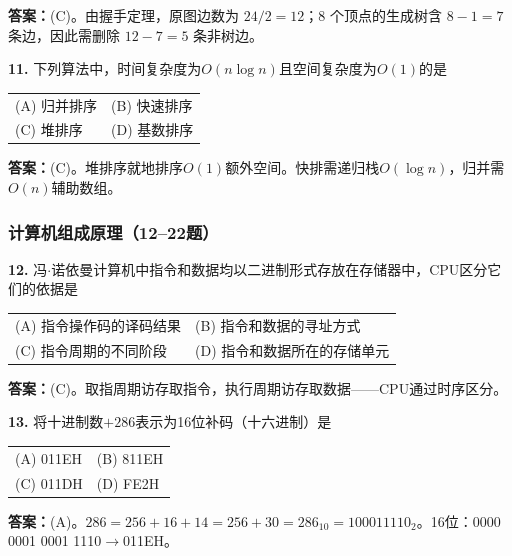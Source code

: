 \ifshowsolutions\par\noindent\textbf{答案：}(C)。由握手定理，原图边数为 $24/2=12$；8 个顶点的生成树含 $8-1=7$ 条边，因此需删除 $12-7=5$ 条非树边。\else \answerarea \fi

\vspace{6pt}

\noindent\textbf{11.} 下列算法中，时间复杂度为$O(n\log n)$且空间复杂度为$O(1)$的是
\begin{center}
\begin{tabular}{ll}
(A) 归并排序 & (B) 快速排序 \\[6pt]
(C) 堆排序 & (D) 基数排序
\end{tabular}
\end{center}

\ifshowsolutions\par\noindent\textbf{答案：}(C)。堆排序就地排序$O(1)$额外空间。快排需递归栈$O(\log n)$，归并需$O(n)$辅助数组。\else \answerarea \fi

\subsubsection*{计算机组成原理（12--22题）}

\noindent\textbf{12.} 冯$\cdot$诺依曼计算机中指令和数据均以二进制形式存放在存储器中，CPU区分它们的依据是
\begin{center}
\begin{tabular}{ll}
(A) 指令操作码的译码结果 & (B) 指令和数据的寻址方式 \\[6pt]
(C) 指令周期的不同阶段 & (D) 指令和数据所在的存储单元
\end{tabular}
\end{center}

\ifshowsolutions\par\noindent\textbf{答案：}(C)。取指周期访存取指令，执行周期访存取数据——CPU通过时序区分。\else \answerarea \fi

\vspace{6pt}

\noindent\textbf{13.} 将十进制数$+286$表示为16位补码（十六进制）是
\begin{center}
\begin{tabular}{ll}
(A) 011EH & (B) 811EH \\[6pt]
(C) 011DH & (D) FE2H
\end{tabular}
\end{center}

\ifshowsolutions\par\noindent\textbf{答案：}(A)。$286=256+16+14=256+30=286_{10}=100011110_2$。16位：0000 0001 0001 1110$\to$011EH。\else \answerarea \fi

